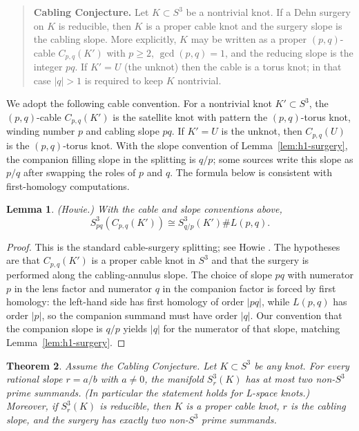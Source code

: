 \documentclass[12pt]{article}
\newtheorem{theorem}{Theorem}[section]
\newtheorem{lemma}[theorem]{Lemma}
\theoremstyle{definition}
\begin{document}
\begin{quote}
\textbf{Cabling Conjecture.} Let \(K\subset S^3\) be a nontrivial knot.  If a Dehn surgery on \(K\) is reducible, then \(K\) is a proper cable knot and the surgery slope is the cabling slope.  More explicitly, \(K\) may be written as a proper \((p,q)\)-cable \(C_{p,q}(K')\) with \(p\ge 2\), \(\gcd(p,q)=1\), and the reducing slope is the integer \(pq\).  If \(K'=U\) (the unknot) then the cable is a torus knot; in that case \(|q|>1\) is required to keep \(K\) nontrivial.
\end{quote}

We adopt the following cable convention.  For a nontrivial knot \(K'\subset S^3\), the \((p,q)\)-cable \(C_{p,q}(K')\) is the satellite knot with pattern the \((p,q)\)-torus knot, winding number \(p\) and cabling slope \(pq\).  If \(K'=U\) is the unknot, then \(C_{p,q}(U)\) is the \((p,q)\)-torus knot.  With the slope convention of Lemma~\ref{lem:h1-surgery}, the companion filling slope in the splitting is \(q/p\); some sources write this slope as \(p/q\) after swapping the roles of \(p\) and \(q\).  The formula below is consistent with first-homology computations.

\begin{lemma}\label{lem:cable-splitting}
(Howie.)  With the cable and slope conventions above,
\[
S^3_{pq}(C_{p,q}(K'))\cong S^3_{q/p}(K')\# L(p,q).
\]
\end{lemma}

\begin{proof}
This is the standard cable-surgery splitting; see Howie \cite{Howie}.  The hypotheses are that \(C_{p,q}(K')\) is a proper cable knot in \(S^3\) and that the surgery is performed along the cabling-annulus slope.  The choice of slope \(pq\) with numerator \(p\) in the lens factor and numerator \(q\) in the companion factor is forced by first homology: the left-hand side has first homology of order \(|pq|\), while \(L(p,q)\) has order \(|p|\), so the companion summand must have order \(|q|\).  Our convention that the companion slope is \(q/p\) yields \(|q|\) for the numerator of that slope, matching Lemma~\ref{lem:h1-surgery}.
\end{proof}

\begin{theorem}\label{thm:conditional-two}
Assume the Cabling Conjecture.  Let \(K\subset S^3\) be any knot.  For every rational slope \(r=a/b\) with \(a\neq 0\), the manifold \(S^3_r(K)\) has at most two non-\(S^3\) prime summands.  (In particular the statement holds for L-space knots.)  Moreover, if \(S^3_r(K)\) is reducible, then \(K\) is a proper cable knot, \(r\) is the cabling slope, and the surgery has exactly two non-\(S^3\) prime summands.
\end{theorem}
\end{document}
